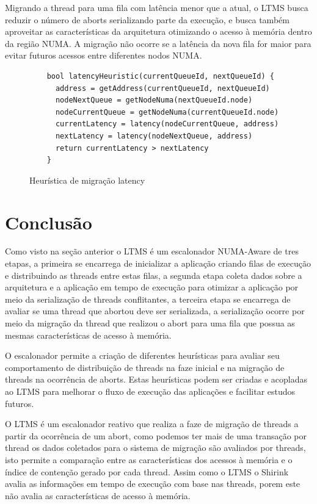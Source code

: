 \documentclass[diss,capa]{texufpel}
\begin{document}
Migrando a thread para uma fila com latência menor que a atual, o LTMS busca reduzir o número de aborts serializando parte da execução, e busca também aproveitar as características da arquitetura otimizando o acesso à memória dentro da região NUMA. A migração não ocorre se a latência da nova fila for maior para evitar futuros acessos entre diferentes nodos NUMA.

\begin{figure}[htbp]
  \centering
  \begin{lstlisting}
    bool latencyHeuristic(currentQueueId, nextQueueId) {
      address = getAddress(currentQueueId, nextQueueId)
      nodeNextQueue = getNodeNuma(nextQueueId.node)
      nodeCurrentQueue = getNodeNuma(currentQueueId.node)
      currentLatency = latency(nodeCurrentQueue, address)
      nextLatency = latency(nodeNextQueue, address)
      return currentLatency > nextLatency
    }
  \end{lstlisting}
  \caption{Heurística de migração latency}
\label{latency}
\end{figure}

\section{Conclusão}

Como visto na seção anterior o LTMS é um escalonador NUMA-Aware de tres etapas, a primeira se encarrega de inicializar a aplicação criando filas de execução e distribuindo as threads entre estas filas, a segunda etapa coleta dados sobre a arquitetura e a aplicação em tempo de execução para otimizar a aplicação por meio da serialização de threads conflitantes, a terceira etapa se encarrega de avaliar se uma thread que abortou deve ser serializada, a serialização ocorre por meio da migração da thread que realizou o abort para uma fila que possua as mesmas características de acesso à memória.

O escalonador permite a criação de diferentes heurísticas para avaliar seu comportamento de distribuição de threads na faze inicial e na migração de threads na ocorrência de aborts. Estas heurísticas podem ser criadas e acopladas ao LTMS para melhorar o fluxo de execução das aplicações e facilitar estudos futuros.

O LTMS é um escalonador reativo que realiza a faze de migração de threads a partir da ocorrência de um abort, como podemos ter mais de uma transação por thread os dados coletados para o sistema de migração são avaliados por threads, isto permite a comparação entre as características dos acessos à memória e o índice de contenção gerado por cada thread. Assim como o LTMS o Shirink~\cite{shirink2009} avalia as informações em tempo de execução com base nas threads, porem este não avalia as características de acesso à memória.
\end{document}
